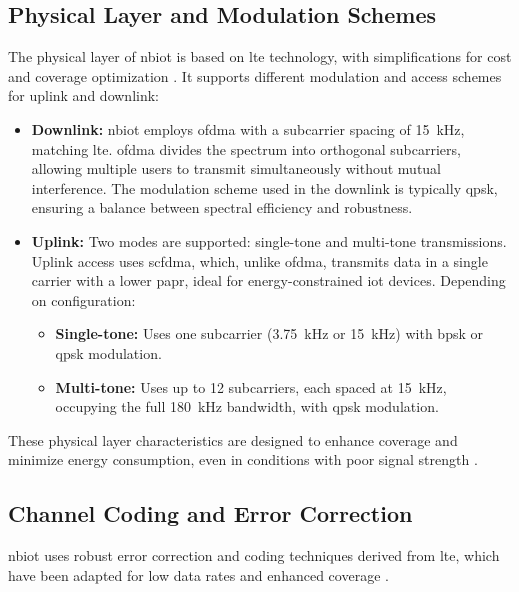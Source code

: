\documentclass[12pt, english, openany]{book}
\begin{document}
\subsection{Physical Layer and Modulation Schemes}

The physical layer of \gls{nbiot} is based on \gls{lte} technology, with simplifications for cost and coverage optimization \parencite{NBIOT_PHYSICAL_LAYER}. It supports different modulation and access schemes for uplink and downlink:

\begin{itemize}
    \item \textbf{Downlink:} \gls{nbiot} employs \gls{ofdma} with a subcarrier spacing of \SI{15}{kHz}, matching \gls{lte}. \gls{ofdma} divides the spectrum into orthogonal subcarriers, allowing multiple users to transmit simultaneously without mutual interference. The modulation scheme used in the downlink is typically \gls{qpsk}, ensuring a balance between spectral efficiency and robustness.

    \item \textbf{Uplink:} Two modes are supported: single-tone and multi-tone transmissions. Uplink access uses \gls{scfdma}, which, unlike \gls{ofdma}, transmits data in a single carrier with a lower \gls{papr}, ideal for energy-constrained \gls{iot} devices. Depending on configuration:
          \begin{itemize}
              \item \textbf{Single-tone:} Uses one subcarrier (\SI{3.75}{kHz} or \SI{15}{kHz}) with \gls{bpsk} or \gls{qpsk} modulation.
              \item \textbf{Multi-tone:} Uses up to 12 subcarriers, each spaced at \SI{15}{kHz}, occupying the full \SI{180}{kHz} bandwidth, with \gls{qpsk} modulation.
          \end{itemize}
\end{itemize}

These physical layer characteristics are designed to enhance coverage and minimize energy consumption, even in conditions with poor signal strength \parencite{NBIOT_PHYSICAL_LAYER}.

\subsection{Channel Coding and Error Correction}

\gls{nbiot} uses robust error correction and coding techniques derived from \gls{lte}, which have been adapted for low data rates and enhanced coverage \parencite{NBIOT_PHYSICAL_LAYER}.
\end{document}
